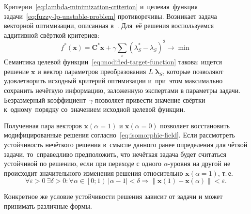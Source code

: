 Критерии~\eqref{eq:lambda-minimization-criterion} и~целевая~функция задачи~\eqref{eq:fuzzy-lp-unstable-problem} противоречивы. Возникает задача векторной оптимизации, описанная в~\cite{MSU_Optimization}. Для~её решения воспользуемся аддитивной свёрткой критериев:
\begin{equation}
\label{eq:modified-target-function}
  f^{*}\left( \mathbf{x} \right)=\mathbf{C}^{*}\mathbf{x}+\gamma \sum\limits_{s}^{}{\left(\lambda_{S}^{*}-\lambda_S \right)}^{2} \to \min
\end{equation}
Семантика целевой функции~\eqref{eq:modified-target-function} такова: ищется решение $\mathbf{x}$ и вектор параметров преобразования $L$ $\mathbf{\lambda}_S$, которые позволяют удовлетворить исходный критерий оптимизации и~при~этом максимально сохранить нечёткую информацию, заложенную экспертами в параметры задачи. Безразмерный коэффициент~$\gamma$ позволяет привести значение свёртки к~одному~порядку со~значением исходной целевой функции.

Полученная пара векторов $\mathbf{x}\left( \alpha =1 \right)$ и $\mathbf{x}\left( \alpha =0 \right)$ позволяет восстановить модифицированные решения согласно~\eqref{eq:isomorphic-field}. Если рассмотреть устойчивость нечёткого решения в~смысле данного ранее определения для чёткой задачи, то~справедливо предположить, что нечёткая задача будет считаться устойчивой по решению, если при переходе с одного $\alpha$-уровня на другой не происходит значительного изменения решения относительно $\mathbf{x}\left( \alpha =1 \right)$, т.\,е.
\begin{equation}
\label{eq:fuzzy-solution-stability}
  \forall \varepsilon >0\ \exists \delta >0:\forall \alpha \in \left[0; 1\right)\ \left| \alpha -1 \right|<\delta \Rightarrow \left\| \mathbf{x}\left( 1 \right)-\mathbf{x}\left( \alpha  \right) \right\|<\varepsilon.
\end{equation}

Конкретное же условие устойчивости решения зависит от задачи и может принимать различные формы.